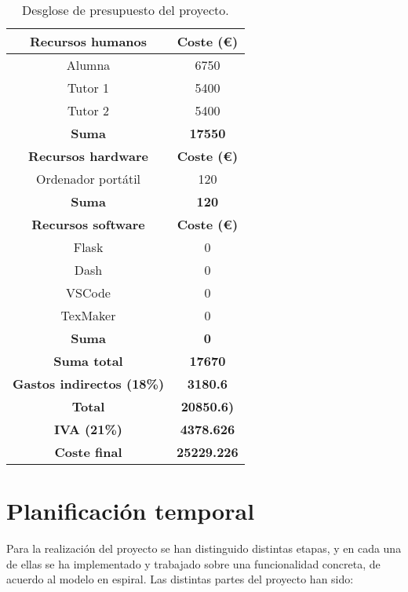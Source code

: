 \begin{table}[!h]
\caption{Desglose de presupuesto del proyecto.}
\begin{center}
\begin{tabular}{|c c|} 
 \hline
 \textbf{Recursos humanos} & \textbf{Coste (€)} \\ 
 \hline\hline
 Alumna & 6750 \\
 \hline
 Tutor 1 & 5400 \\
 \hline 
 Tutor 2 & 5400 \\
 \textbf{Suma} & \textbf{17550} \\
 \hline
 \textbf{Recursos hardware} & \textbf{Coste (€)} \\ 
 \hline\hline
 Ordenador portátil & 120 \\
 \hline
 \textbf{Suma} & \textbf{120} \\
 \hline 
 \textbf{Recursos software} & \textbf{Coste (€)} \\
 \hline
  Flask & 0 \\
  \hline
  Dash & 0 \\
  \hline 
  VSCode & 0 \\
  \hline
  TexMaker & 0 \\
  \hline 
  \textbf{Suma} & \textbf{0} \\ 
 \hline\hline
 \textbf{Suma total} & \textbf{17670} \\
 \hline\hline
 \textbf{Gastos indirectos (18\%)} & \textbf{3180.6} \\ 
 \hline\hline
 \textbf{Total} & \textbf{20850.6)} \\ 
 \hline\hline
 \textbf{IVA (21\%)} & \textbf{4378.626} \\ 
 \hline\hline
 \textbf{Coste final} & \textbf{25229.226} \\ 
 \hline\hline

 \hline
\end{tabular}
\label{tabla_pres}
\end{center}
\end{table}

\section{Planificación temporal}

Para la realización del proyecto se han distinguido distintas etapas, y en cada una de ellas se ha implementado y trabajado sobre una funcionalidad concreta, de acuerdo al modelo en espiral. Las distintas partes del proyecto han sido:

